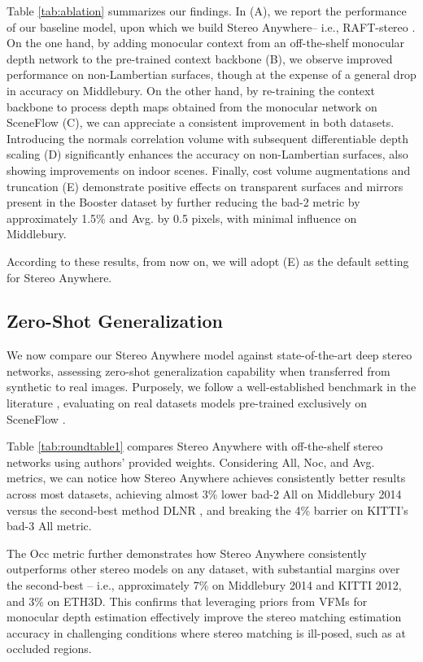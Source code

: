 \documentclass[10pt,twocolumn,letterpaper]{article}
\newcommand{\method}[0]{Stereo Anywhere\xspace}
\begin{document}
Table \ref{tab:ablation} summarizes our findings. In (A), we report the performance of our baseline model, upon which we build \method -- i.e., RAFT-stereo \cite{lipson2021raft}. On the one hand, by adding monocular context from an off-the-shelf monocular depth network to the pre-trained context backbone (B), we observe improved performance on non-Lambertian surfaces, though at the expense of a general drop in accuracy on Middlebury. On the other hand, by re-training the context backbone to process depth maps obtained from the monocular network on SceneFlow (C), we can appreciate a consistent improvement in both datasets.
Introducing the normals correlation volume with subsequent differentiable depth scaling (D) significantly enhances the accuracy on non-Lambertian surfaces, also showing improvements on indoor scenes.
Finally, cost volume augmentations and truncation (E) demonstrate positive effects on transparent surfaces and mirrors present in the Booster dataset by further reducing the bad-2 metric by approximately 1.5\% and Avg. by 0.5 pixels, with minimal influence on Middlebury.

According to these results, from now on, we will adopt (E) as the default setting for \method.

\subsection{Zero-Shot Generalization}

We now compare our \method model against state-of-the-art deep stereo networks, assessing zero-shot generalization capability when transferred from synthetic to real images.
Purposely, we follow a well-established benchmark in the literature \cite{lipson2021raft,Tosi_2023_CVPR}, evaluating on real datasets models pre-trained exclusively on SceneFlow \cite{mayer2016large}.

Table \ref{tab:roundtable1} compares \method with off-the-shelf stereo networks using authors' provided weights. Considering All, Noc, and Avg. metrics, we can notice how \method achieves consistently better results across most datasets, achieving almost 3\% lower bad-2 All on Middlebury 2014 versus the second-best method DLNR \cite{zhao2023high}, and breaking the 4\% barrier on KITTI's bad-3 All metric.

The Occ metric further demonstrates how \method{} consistently outperforms other stereo models on any dataset, with substantial margins over the second-best -- i.e., approximately 7\% on Middlebury 2014 and KITTI 2012, and 3\% on ETH3D. This confirms that leveraging priors from VFMs for monocular depth estimation effectively improve the stereo matching estimation accuracy in challenging conditions where stereo matching is ill-posed, such as at occluded regions.
\end{document}
